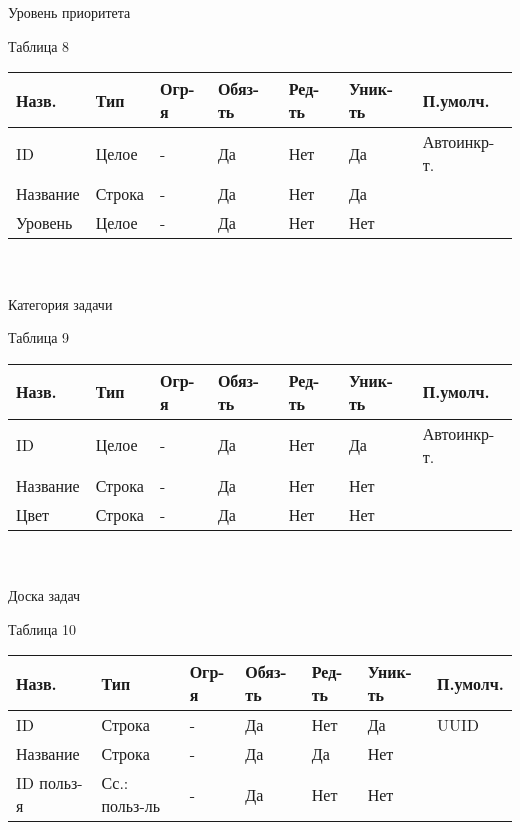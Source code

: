 \documentclass[../document.tex]{subfiles}
\begin{document}
\\\\
Уровень приоритета
\begin{flushright}
  Таблица 8
\end{flushright}
\begin{tabular}{ | l | l | l | l | l | l | l | }
  \hline
  Назв.    & Тип    & Огр-я & Обяз-ть & Ред-ть & Уник-ть & П.умолч.    \\
  \hline
  ID       & Целое  & -     & Да      & Нет    & Да      & Автоинкр-т. \\
  Название & Строка & -     & Да      & Нет    & Да      &             \\
  Уровень  & Целое  & -     & Да      & Нет    & Нет     &             \\
  \hline
\end{tabular}
\\\\
Категория задачи
\begin{flushright}
  Таблица 9
\end{flushright}
\begin{tabular}{ | l | l | l | l | l | l | l | }
  \hline
  Назв.    & Тип    & Огр-я & Обяз-ть & Ред-ть & Уник-ть & П.умолч.    \\
  \hline
  ID       & Целое  & -     & Да      & Нет    & Да      & Автоинкр-т. \\
  Название & Строка & -     & Да      & Нет    & Нет     &             \\
  Цвет     & Строка & -     & Да      & Нет    & Нет     &             \\
  \hline
\end{tabular}
\\\\
Доска задач
\begin{flushright}
  Таблица 10
\end{flushright}
\begin{tabular}{ | l | l | l | l | l | l | l | }
  \hline
  Назв.      & Тип           & Огр-я & Обяз-ть & Ред-ть & Уник-ть & П.умолч. \\
  \hline
  ID         & Строка        & -     & Да      & Нет    & Да      & UUID     \\
  Название   & Строка        & -     & Да      & Да     & Нет     &          \\
  ID польз-я & Сс.: польз-ль & -     & Да      & Нет    & Нет     &          \\
  \hline
\end{tabular}
\\\\
\end{document}

